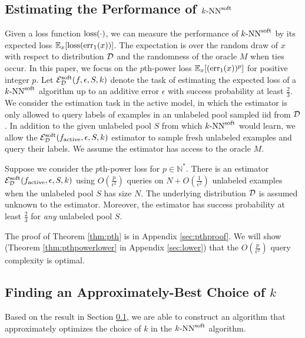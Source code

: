 \subsection{Estimating the Performance of ${\text{$k$-NN}^{\mathrm{soft}}}$}
\label{subsec:knnsoft}
Given a loss function ${\mathrm{loss}}(\cdot)$, we can measure the performance of ${\text{$k$-NN}^{\mathrm{soft}}}$ by its expected loss $\mathbb E_{x}[{\mathrm{loss}}({\mathrm{err}_1}(x))]$. The expectation is over the random draw of $x$ with respect to distribution ${\mathcal{D}}$ and the randomness of the oracle $M$ when ties occur. In this paper, we focus on the $p$th-power loss $\mathbb E_{x}[({\mathrm{err}_1}(x))^p]$ for positive integer $p$. Let $\mathcal{E}^{\mathrm{soft}}_{{\mathcal{D}}} (f,\epsilon,S,k)$ denote the task of estimating the expected loss of a ${\text{$k$-NN}^{\mathrm{soft}}}$ algorithm up to an additive error $\epsilon$ with success probability at least $\frac{2}{3}$. We consider the estimation task in the active model, in which the estimator is only allowed to query labels of examples in an unlabeled pool sampled iid from ${\mathcal{D}}$. In addition to the given unlabeled pool $S$ from which ${\text{$k$-NN}^{\mathrm{soft}}}$ would learn, we allow the $\mathcal{E}^{\mathrm{soft}}_{{\mathcal{D}}} (f_{\mathrm{active}},\epsilon,S,k)$ estimator to sample fresh unlabeled examples and query their labels. We assume the estimator has access to the oracle $M$.%
\begin{theorem}
\label{thm:pth}
Suppose we consider the $p$th-power loss for $p\in\mathbb N^*$. There is an estimator $\mathcal{E}^{\mathrm{soft}}_{{\mathcal{D}}}(f_{\mathrm{active}},\epsilon,S,k)$ using $O(\frac{p}{\epsilon^2})$ queries on $N+O(\frac{1}{\epsilon^2})$ unlabeled examples when the unlabeled pool $S$ has size $N$. The underlying distribution ${\mathcal{D}}$ is assumed unknown to the estimator. Moreover, the estimator has success probability at least $\frac{2}{3}$ for \emph{any} unlabeled pool $S$.
\end{theorem}
The proof of Theorem \ref{thm:pth} is in Appendix \ref{sec:pthproof}. We will show (Theorem \ref{thm:pthpowerlower} in Appendix \ref{sec:lower}) that the $O(\frac{p}{\epsilon^2})$ query complexity is optimal.

\subsection{Finding an Approximately-Best Choice of $k$}
\label{subsec:bestk}
Based on the result in Section \ref{subsec:knnsoft}, we are able to construct an algorithm that approximately optimizes the choice of $k$ in the ${\text{$k$-NN}^{\mathrm{soft}}}$ algorithm.

